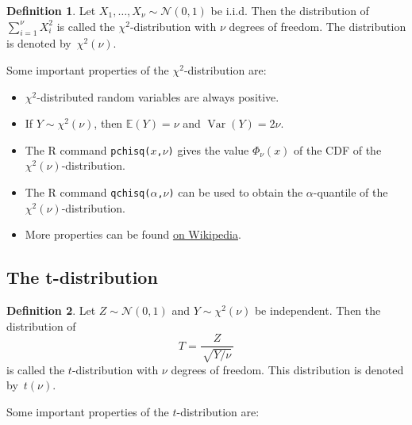 \documentclass[
  a4paper,
]{article}
\theoremstyle{definition}
\newtheorem{definition}{Definition}[section]
\theoremstyle{definition}
\theoremstyle{definition}
\theoremstyle{definition}
\theoremstyle{remark}
\begin{document}
\begin{definition}
\protect\hypertarget{def:chi-squared-dist}{}\label{def:chi-squared-dist}Let \(X_1, \ldots, X_\nu \sim \mathcal{N}(0, 1)\) be i.i.d. Then the
distribution of \(\sum_{i=1}^\nu X_i^2\) is called the
\(\chi^2\)-distribution with \(\nu\) degrees of freedom. The
distribution is denoted by~\(\chi^2(\nu)\).
\end{definition}

Some important properties of the \(\chi^2\)-distribution are:

\begin{itemize}
\item
  \(\chi^2\)-distributed random variables are always positive.
\item
  If \(Y\sim \chi^2(\nu)\), then \(\mathbb{E}(Y) = \nu\) and \(\mathop{\mathrm{Var}}(Y) = 2\nu\).
\item
  The R command \texttt{pchisq(\textbar{}}\(x\)\texttt{,}\(\nu\)\texttt{)} gives the value
  \(\Phi_\nu(x)\) of the CDF of the \(\chi^2(\nu)\)-distribution.
\item
  The R command \texttt{qchisq(}\(\alpha\)\texttt{,}\(\nu\)\texttt{)} can
  be used to obtain the
  \(\alpha\)-quantile of the \(\chi^2(\nu)\)-distribution.
\item
  More properties can be found
  \href{https://en.wikipedia.org/wiki/Chi-squared_distribution}{on Wikipedia}.
\end{itemize}

\hypertarget{t}{%
\subsection{The t-distribution}\label{t}}

\begin{definition}
\protect\hypertarget{def:t-dist}{}\label{def:t-dist}Let \(Z \sim \mathcal{N}(0,1)\) and \(Y \sim \chi^2(\nu)\) be independent. Then
the distribution of
\begin{equation}
  T
  = \frac{\,Z\,}{\,\sqrt{Y / \nu}\,}  \label{eq:t-def}
\end{equation}
is called the \(t\)-distribution with \(\nu\) degrees of freedom.
This distribution is denoted by~\(t(\nu)\).
\end{definition}

Some important properties of the \(t\)-distribution are:
\end{document}
